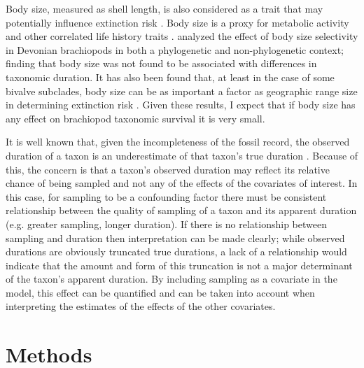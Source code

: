 \documentclass[11pt]{article}
\begin{document}
Body size, measured as shell length, is also considered as a trait that may potentially influence extinction risk \citep{Payne2014,Harnik2011}. Body size is a proxy for metabolic activity and other correlated life history traits \citep{Payne2014}. \citet{Harnik2014} analyzed the effect of body size selectivity in Devonian brachiopods in both a phylogenetic and non-phylogenetic context; finding that body size was not found to be associated with differences in taxonomic duration. It has also been found that, at least in the case of some bivalve subclades, body size can be as important a factor as geographic range size in determining extinction risk \citep{Harnik2011}. Given these results, I expect that if body size has any effect on brachiopod taxonomic survival it is very small.

It is well known that, given the incompleteness of the fossil record, the observed duration of a taxon is an underestimate of that taxon's true duration \citep{Solow1997,Wagner2013a,Wang2004,Liow2010b,Alroy2014a,Foote1996e}. Because of this, the concern is that a taxon's observed duration may reflect its relative chance of being sampled and not any of the effects of the covariates of interest. In this case, for sampling to be a confounding factor there must be consistent relationship between the quality of sampling of a taxon and its apparent duration (e.g. greater sampling, longer duration). If there is no relationship between sampling and duration then interpretation can be made clearly; while observed durations are obviously truncated true durations, a lack of a relationship would indicate that the amount and form of this truncation is not a major determinant of the taxon's apparent duration. By including sampling as a covariate in the model, this effect can be quantified and can be taken into account when interpreting the estimates of the effects of the other covariates.






\section*{Methods}
\end{document}

